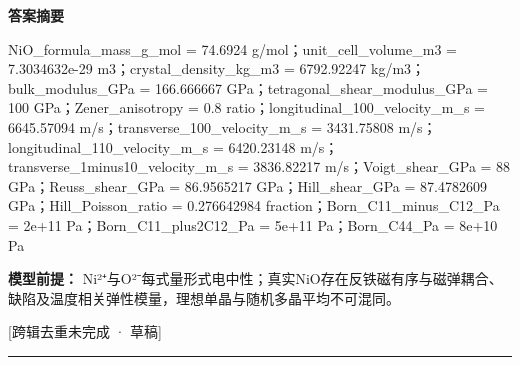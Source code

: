 \documentclass[UTF8,11pt,a4paper]{ctexart}
\begin{document}
\noindent\textbf{答案摘要}\par
NiO\_formula\_mass\_g\_mol = 74.6924 g/mol；unit\_cell\_volume\_m3 = 7.3034632e-29 m3；crystal\_density\_kg\_m3 = 6792.92247 kg/m3；bulk\_modulus\_GPa = 166.666667 GPa；tetragonal\_shear\_modulus\_GPa = 100 GPa；Zener\_anisotropy = 0.8 ratio；longitudinal\_100\_velocity\_m\_s = 6645.57094 m/s；transverse\_100\_velocity\_m\_s = 3431.75808 m/s；longitudinal\_110\_velocity\_m\_s = 6420.23148 m/s；transverse\_1minus10\_velocity\_m\_s = 3836.82217 m/s；Voigt\_shear\_GPa = 88 GPa；Reuss\_shear\_GPa = 86.9565217 GPa；Hill\_shear\_GPa = 87.4782609 GPa；Hill\_Poisson\_ratio = 0.276642984 fraction；Born\_C11\_minus\_C12\_Pa = 2e+11 Pa；Born\_C11\_plus2C12\_Pa = 5e+11 Pa；Born\_C44\_Pa = 8e+10 Pa\par
\noindent\textbf{模型前提：}
Ni²⁺与O²⁻每式量形式电中性；真实NiO存在反铁磁有序与磁弹耦合、缺陷及温度相关弹性模量，理想单晶与随机多晶平均不可混同。\par
\noindent\textcolor{red!65!black}{[跨辑去重未完成 · 草稿]} \par
\medskip\hrule\medskip
{}
\end{document}
